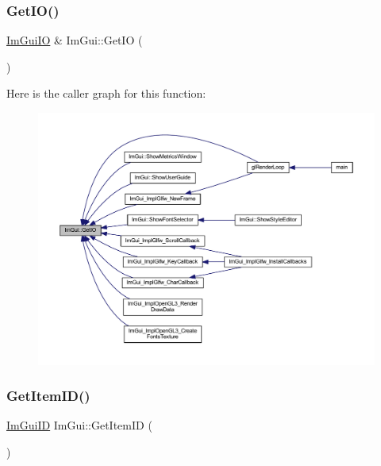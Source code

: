 \subsubsection{\texorpdfstring{Get\+I\+O()}{GetIO()}}
{\footnotesize\ttfamily \mbox{\hyperlink{struct_im_gui_i_o}{Im\+Gui\+IO}} \& Im\+Gui\+::\+Get\+IO (\begin{DoxyParamCaption}{ }\end{DoxyParamCaption})}

Here is the caller graph for this function\+:
\nopagebreak
\begin{figure}[H]
\begin{center}
\leavevmode
\includegraphics[width=350pt]{namespace_im_gui_a3179e560812f878f3961ce803a5d9302_icgraph}
\end{center}
\end{figure}
\mbox{\label{namespace_im_gui_a102bd745dcb69ab33637e25ceeabb444}} 
\subsubsection{\texorpdfstring{Get\+Item\+I\+D()}{GetItemID()}}
{\footnotesize\ttfamily \mbox{\hyperlink{imgui_8h_a1785c9b6f4e16406764a85f32582236f}{Im\+Gui\+ID}} Im\+Gui\+::\+Get\+Item\+ID (\begin{DoxyParamCaption}{ }\end{DoxyParamCaption})\hspace{0.3cm}{\ttfamily [inline]}}

\mbox{\label{namespace_im_gui_a3d260209b8dc25a2c942e8cfd1ed0e51}} 
